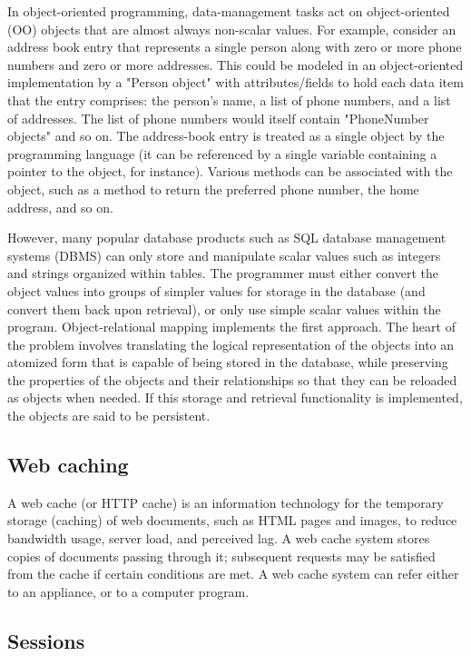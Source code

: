\documentclass[preprint,numbers,numberedpars,10pt]{sigplanconf}
\begin{document}
In object-oriented programming, data-management tasks act on object-oriented (OO) objects that are almost always non-scalar values.
For example, consider an address book entry that represents a single person along with zero or more phone numbers and zero or more addresses.
This could be modeled in an object-oriented implementation by a "Person object" with attributes/fields to hold each data item that the entry
comprises: the person's name, a list of phone numbers, and a list of addresses. The list of phone numbers would itself contain "PhoneNumber objects"
and so on. The address-book entry is treated as a single object by the programming language (it can be referenced by a single variable containing a
pointer to the object, for instance). Various methods can be associated with the object, such as a method to return the preferred phone number,
the home address, and so on.

However, many popular database products such as SQL database management systems (DBMS) can only store and manipulate scalar values such as integers
and strings organized within tables. The programmer must either convert the object values into groups of simpler values for storage in the database
(and convert them back upon retrieval), or only use simple scalar values within the program. Object-relational mapping implements the first approach.
The heart of the problem involves translating the logical representation of the objects into an atomized form that is capable of being stored in the
database, while preserving the properties of the objects and their relationships so that they can be reloaded as objects when needed.
If this storage and retrieval functionality is implemented, the objects are said to be persistent.


\subsection{Web caching}

A web cache (or HTTP cache) is an information technology for the temporary storage (caching) of web documents, such as HTML pages and images,
to reduce bandwidth usage, server load, and perceived lag. A web cache system stores copies of documents passing through it; subsequent requests
may be satisfied from the cache if certain conditions are met. A web cache system can refer either to an appliance, or to a computer program.

\subsection{Sessions}
\end{document}
